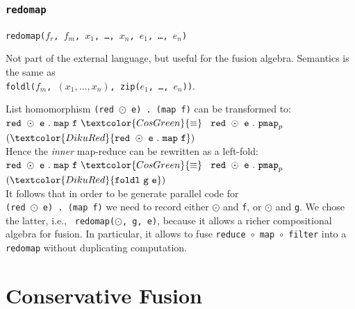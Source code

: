 \documentclass{beamer}
\newcommand{\emp}[1]{\textcolor{DikuRed}{ #1}}
\newcommand{\emphh}[1]{\textcolor{CosGreen}{ #1}}
\begin{document}
\begin{frame}[fragile,t]
  \frametitle{{\tt redomap}}

  {\tt redomap($f_{r}$, $f_{m}$, $x_{1}$, \ldots, $x_{n}$, $e_{1}$, \ldots, $e_{n}$)}

  Not part of the external language, but useful for the fusion
  algebra.  Semantics is the same as\\{\tt foldl($f_{m}$, $(x_{1},\ldots,x_{n})$, zip($e_{1}$, \ldots, $e_{n}$))}.
\pause
\begin{block}{List homomorphism} {\tt (red $\odot$ e) . (map f)} can
  be transformed to:  \\
  ${\tt red}\mbox{ }\odot\mbox{ }{\tt e}\mbox{ }.\mbox{ }{\tt
    map}\mbox{ }{\tt f}\mbox{ }\emphh{\equiv}$ $\mbox{ }{\tt
    red}\mbox{ }\odot\mbox{ }{\tt e}\mbox{ }.\mbox{ }{\tt pmap}_{p}
  \mbox{ }$ $(\emp{{\tt red} \mbox{
    }\odot\mbox{ }{\tt e}\mbox{ }.\mbox{ }{\tt map}\mbox{ }{\tt f}})$\\
  Hence the {\em inner} map-reduce can be
  rewritten as a left-fold:\\
  ${\tt red}\mbox{ }\odot\mbox{ }{\tt e}\mbox{ }.\mbox{ }{\tt
    map}\mbox{ }{\tt f}\mbox{ }\emphh{\equiv}$ $\mbox{ }{\tt
    red}\mbox{ }\odot\mbox{ }{\tt e}\mbox{ }.\mbox{ }{\tt pmap}_{p}
  \mbox{ }$ $(\emp{{\tt foldl}\mbox{
    }{\tt g}\mbox{ }{\tt e}})$\\
  It follows that in order to be generate parallel code for \\
  {\tt (red $\odot$ e) . (map f)} we need to record either $\odot$ and
  {\tt f}, or $\odot$ and {\tt g}. We chose the latter, i.e., {\tt
    redomap($\odot$, g, e)}, because it allows a richer compositional
  algebra for fusion.  In particular, it allows to fuse {\tt reduce
    $\circ$ map $\circ$ filter} into a {\tt redomap} without
  duplicating computation.
\end{block}

\end{frame}

\section{Conservative Fusion}
\end{document}
